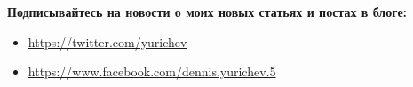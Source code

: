 \vspace*{\fill}

\normalsize \textbf{Подписывайтесь на новости о моих новых статьях и постах в блоге:}

\bigskip
\bigskip
\bigskip

\begin{itemize}

\item \url{https://twitter.com/yurichev}

\item \url{https://www.facebook.com/dennis.yurichev.5}

\end{itemize}

\bigskip
\bigskip
\bigskip

\vspace*{\fill}
\vfill
